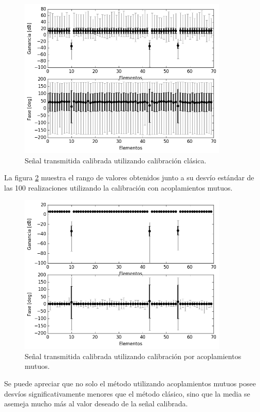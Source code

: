 \begin{figure}[H]
	\centering
	\includegraphics[width=10cm]{gfx/classicalMontecarlo.png}
	\caption{Señal transmitida calibrada utilizando calibración clásica.}
	\label{fig:classicalMontecarlo}
\end{figure}

La figura \ref{fig:mutualMontecarlo} muestra  el rango de valores obtenidos junto a su desvío estándar de las 100 
realizaciones utilizando la calibración con acoplamientos mutuos.

\begin{figure}[H]
	\centering
	\includegraphics[width=10cm]{gfx/mutualMontecarlo.png}
	\caption{Señal transmitida calibrada utilizando calibración por acoplamientos mutuos.}
	\label{fig:mutualMontecarlo}
\end{figure}

Se puede apreciar que no solo el método utilizando acoplamientos mutuos posee desvíos significativamente menores que el 
método clásico, sino que la media se asemeja mucho más al valor deseado de la señal calibrada.


